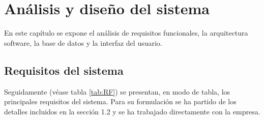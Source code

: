 \chapter{Análisis y diseño del sistema}

En este capítulo se expone el análisis de requisitos funcionales, la arquitectura software, la base de datos y la interfaz del usuario.

\section{Requisitos del sistema}
\label{section-requisitos}

Seguidamente (véase tabla \ref{tab:RF}) se presentan, en modo de tabla, los principales requisitos del sistema. Para su formulación se ha partido de los detalles incluidos en la sección 1.2 y se ha trabajado directamente con la empresa.


